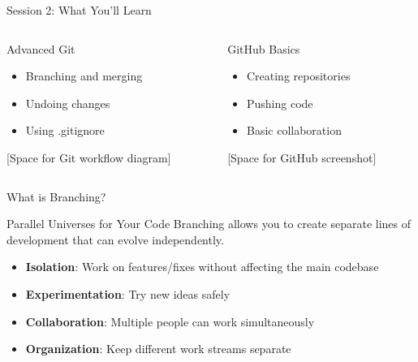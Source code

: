 \documentclass[aspectratio=169]{beamer}
\begin{document}
\begin{frame}{Session 2: What You'll Learn}
  \begin{columns}
    \begin{column}{0.48\textwidth}
      \begin{block}{Advanced Git}
        \begin{itemize}
          \item Branching and merging
          \item Undoing changes
          \item Using .gitignore
        \end{itemize}
      \end{block}
      
      \begin{center}
        [Space for Git workflow diagram]
      \end{center}
    \end{column}
    
    \begin{column}{0.48\textwidth}
      \begin{block}{GitHub Basics}
        \begin{itemize}
          \item Creating repositories
          \item Pushing code
          \item Basic collaboration
        \end{itemize}
      \end{block}
      
      \begin{center}
        [Space for GitHub screenshot]
      \end{center}
    \end{column}
  \end{columns}
\end{frame}

\begin{frame}{What is Branching?}
  \begin{block}{Parallel Universes for Your Code}
    Branching allows you to create separate lines of development that can evolve independently.
    
    \begin{itemize}
      \item \textbf{Isolation}: Work on features/fixes without affecting the main codebase
      \item \textbf{Experimentation}: Try new ideas safely
      \item \textbf{Collaboration}: Multiple people can work simultaneously
      \item \textbf{Organization}: Keep different work streams separate
    \end{itemize}
  \end{block}
  
  \vspace{0.5cm}
  
\end{frame}
\end{document}
